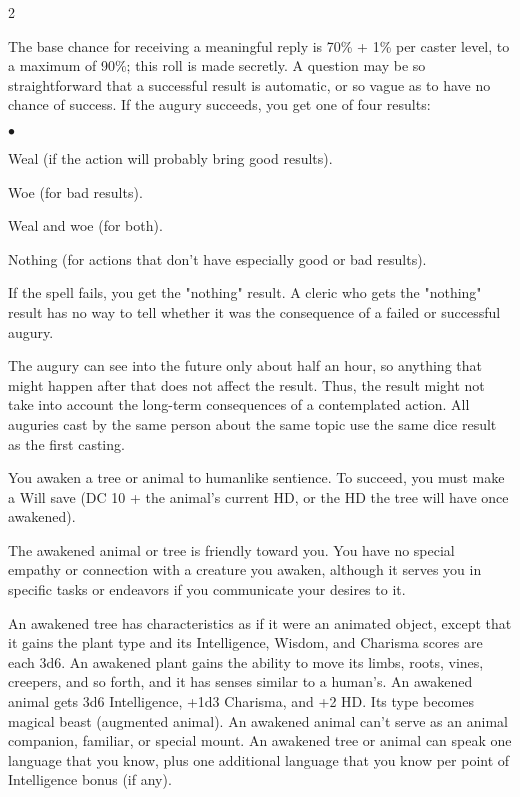 \begin{multicols}{2}
\begin{small}
\smallskip\noindent The base chance for receiving a meaningful reply is 70\% + 1\% per caster level, to a maximum of 90\%; this roll is made secretly. A question may be so straightforward that a successful result is automatic, or so vague as to have no chance of success. If the augury succeeds, you get one of four results:

\begin{list}{$\bullet$}{\itemspace}
	\item Weal (if the action will probably bring good results).
  \item Woe (for bad results).
  \item Weal and woe (for both).
  \item Nothing (for actions that don't have especially good or bad results).
\end{list}

\smallskip\noindent If the spell fails, you get the "nothing" result. A cleric who gets the "nothing" result has no way to tell whether it was the consequence of a failed or successful augury.

\smallskip\noindent The augury can see into the future only about half an hour, so anything that might happen after that does not affect the result. Thus, the result might not take into account the long-term consequences of a contemplated action. All auguries cast by the same person about the same topic use the same dice result as the first casting.


\noindent You awaken a tree or animal to humanlike sentience. To succeed, you must make a Will save (DC 10 + the animal's current HD, or the HD the tree will have once awakened).

\smallskip\noindent The awakened animal or tree is friendly toward you. You have no special empathy or connection with a creature you awaken, although it serves you in specific tasks or endeavors if you communicate your desires to it.

\smallskip\noindent An awakened tree has characteristics as if it were an animated object, except that it gains the plant type and its Intelligence, Wisdom, and Charisma scores are each 3d6. An awakened plant gains the ability to move its limbs, roots, vines, creepers, and so forth, and it has senses similar to a human's. An awakened animal gets 3d6 Intelligence, +1d3 Charisma, and +2 HD. Its type becomes magical beast (augmented animal). An awakened animal can't serve as an animal companion, familiar, or special mount. An awakened tree or animal can speak one language that you know, plus one additional language that you know per point of Intelligence bonus (if any).


\end{small}
\end{multicols}
